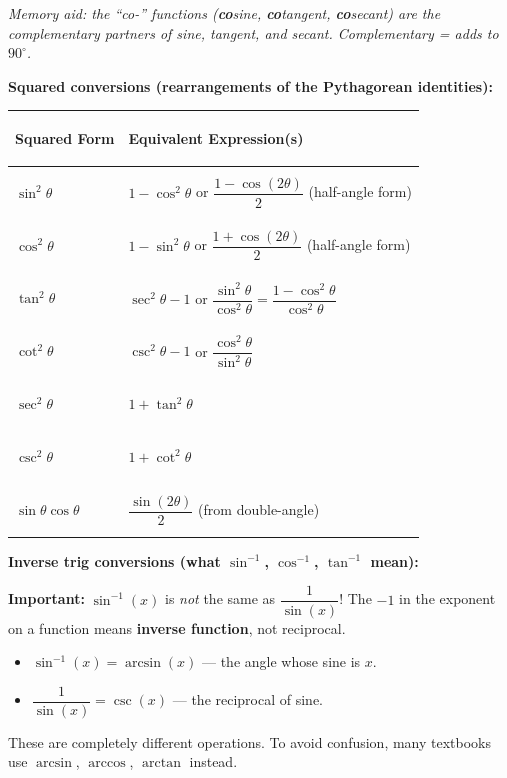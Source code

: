 \documentclass[11pt, letterpaper]{article}
\begin{document}
\vspace{4pt}
\textit{Memory aid: the ``co-'' functions (\textbf{co}sine, \textbf{co}tangent, \textbf{co}secant) are the complementary partners of sine, tangent, and secant. Complementary = adds to $90^\circ$.}

\vspace{6pt}
\textbf{Squared conversions (rearrangements of the Pythagorean identities):}

\noindent
{\small\renewcommand{\arraystretch}{1.7}
\begin{tabularx}{\textwidth}{>{\bfseries\raggedright\arraybackslash}p{3cm}
                              >{\raggedright\arraybackslash}X}
\toprule
\rowcolor{tableheaderpurple}
\textbf{Squared Form} & \textbf{Equivalent Expression(s)} \\
\midrule
\rowcolor{rowPu} $\sin^2\theta$   & $1 - \cos^2\theta$ \quad or \quad $\dfrac{1 - \cos(2\theta)}{2}$ (half-angle form) \\
\rowcolor{rowA}  $\cos^2\theta$   & $1 - \sin^2\theta$ \quad or \quad $\dfrac{1 + \cos(2\theta)}{2}$ (half-angle form) \\
\rowcolor{rowPu} $\tan^2\theta$   & $\sec^2\theta - 1$ \quad or \quad $\dfrac{\sin^2\theta}{\cos^2\theta} = \dfrac{1 - \cos^2\theta}{\cos^2\theta}$ \\
\rowcolor{rowA}  $\cot^2\theta$   & $\csc^2\theta - 1$ \quad or \quad $\dfrac{\cos^2\theta}{\sin^2\theta}$ \\
\rowcolor{rowPu} $\sec^2\theta$   & $1 + \tan^2\theta$ \\
\rowcolor{rowA}  $\csc^2\theta$   & $1 + \cot^2\theta$ \\
\rowcolor{rowPu} $\sin\theta\cos\theta$ & $\dfrac{\sin(2\theta)}{2}$ (from double-angle) \\
\bottomrule
\end{tabularx}}

\vspace{6pt}
\textbf{Inverse trig conversions (what $\sin^{-1}$, $\cos^{-1}$, $\tan^{-1}$ mean):}

\begin{tcolorbox}[colback=part3bg, colframe=sectionpurple, arc=3pt, boxrule=1pt]
\textbf{Important:} $\sin^{-1}(x)$ is \emph{not} the same as $\dfrac{1}{\sin(x)}$! The $-1$ in the exponent on a function means \textbf{inverse function}, not reciprocal.
\begin{itemize}[noitemsep, leftmargin=*]
  \item $\sin^{-1}(x) = \arcsin(x)$ --- the angle whose sine is $x$.
  \item $\dfrac{1}{\sin(x)} = \csc(x)$ --- the reciprocal of sine.
\end{itemize}
These are completely different operations. To avoid confusion, many textbooks use $\arcsin$, $\arccos$, $\arctan$ instead.
\end{tcolorbox}
\end{document}
